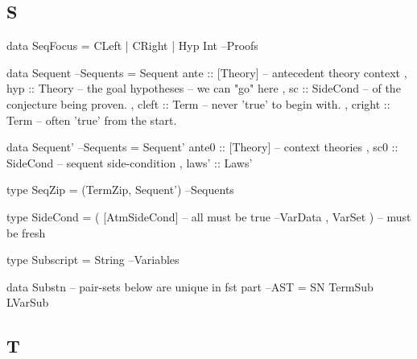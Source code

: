 \subsection{S}

\begin{code}
data SeqFocus = CLeft | CRight | Hyp Int                              --Proofs
\end{code}

\begin{code}
data Sequent                                                        --Sequents
  = Sequent {
     ante :: [Theory] -- antecedent theory context
   , hyp :: Theory -- the goal hypotheses -- we can "go" here
   , sc :: SideCond -- of the conjecture being proven.
   , cleft :: Term -- never 'true' to begin with.
   , cright :: Term -- often 'true' from the start.
   }
\end{code}

\begin{code}
data Sequent'                                                       --Sequents
  = Sequent' {
      ante0 :: [Theory] -- context theories
    , sc0       :: SideCond -- sequent side-condition
    , laws'     :: Laws'
    }
\end{code}

\begin{code}
type SeqZip = (TermZip, Sequent')                                   --Sequents
\end{code}

\begin{code}
type SideCond = ( [AtmSideCond]  -- all must be true                 --VarData
                , VarSet )       -- must be fresh
\end{code}


\begin{code}
type Subscript = String                                            --Variables
\end{code}

\begin{code}
data Substn --  pair-sets below are unique in fst part                  --AST
  = SN TermSub LVarSub
\end{code}

\subsection{T}

